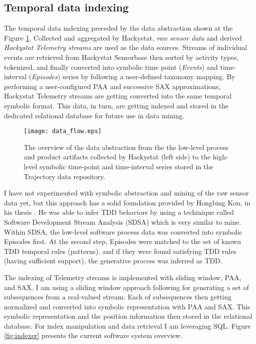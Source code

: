 \subsection{Temporal data indexing}
The temporal data indexing preceded by the data abstraction shown at the Figure \ref{fig:data_flow}. Collected and aggregated by Hackystat, \textit{raw sensor data} and derived \textit{Hackystat Telemetry streams} are used as the data sources. Streams of individual events are retrieved from Hackystat Sensorbase then sorted by activity types, tokenized, and finally converted into symbolic time point (\textit{Events}) and time-interval (\textit{Episodes}) series by following a user-defined taxonomy mapping. By performing a user-configured PAA and successive SAX approximations, Hackystat Telemetry streams are getting converted into the same temporal symbolic format. This data, in turn, are getting indexed and stored in the dedicated relational database for future use in data mining.

\begin{figure}[tbp]
   \centering
   \texttt{[image: data\_flow.eps]}
   \caption{The overview of the data abstraction from the the low-level process and product artifacts collected by Hackystat (left side) to the high-level symbolic time-point and time-interval series stored in the Trajectory data repository.}
   \label{fig:data_flow}
\end{figure}

I have not experimented with symbolic abstraction and mining of the raw sensor data yet, but this approach has a solid foundation provided by Hongbing Kou, in his thesis \cite{citeulike:2703162}. He was able to infer TDD behaviors by using a techinique called Software Development Stream Analysis (SDSA) which is very similar to mine. Within SDSA, the low-level software process data was converted into symbolic Episodes first. At the second step, Episodes were matched to the set of known TDD temporal rules (patterns), and if they were found satisfying TDD rules (having sufficient support), the generative process was inferred as TDD.

The indexing of Telemetry streams is implemented with sliding window, PAA, and SAX. I am using a sliding window approach following \cite{citeulike:2821475} for generating a set of subsequences from a real-valued stream. Each of subsequences then getting normalized and converted into symbolic representation with PAA and SAX. This symbolic representation and the position information then stored in the relational database. For index manipulation and data retrieval I am leveraging SQL. Figure \ref{fig:indexer} presents the current software system overview.

